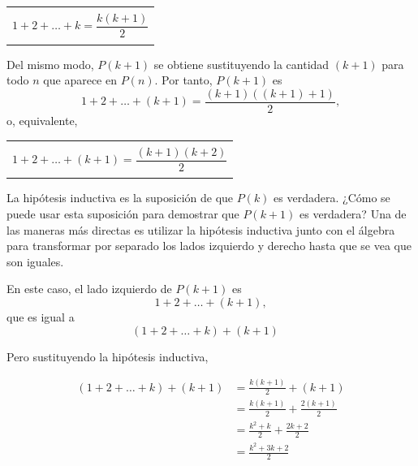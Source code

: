 \documentclass{article}
\begin{document}
\begin{center}
    \begin{tabular}{|c|}
        \hline
        \\
        $1 + 2 + \dots + k = \dfrac{k(k + 1)}{2}$ \\
        \\
        \hline
    \end{tabular} 
\end{center}

\bigskip

Del mismo modo, $P(k + 1)$ se obtiene sustituyendo la cantidad $(k + 1)$ para todo $n$ que aparece en $P(n)$. Por tanto, $P(k + 1)$ es
\[
1 + 2 + \dots + (k + 1) = \frac{(k + 1)((k + 1) + 1)}{2},
\]
o, equivalente,

\begin{center}
    \begin{tabular}{|c|}
        \hline
        \\
        $1 + 2 + \dots + (k + 1) = \dfrac{(k + 1)(k + 2)}{2}$ \\
        \\
        \hline
    \end{tabular} 
\end{center}

 \bigskip

La hipótesis inductiva es la suposición de que $P(k)$ es verdadera. ¿Cómo se puede usar esta suposición para demostrar que $P(k + 1)$ es verdadera? Una de las maneras más directas es utilizar la hipótesis inductiva junto con el álgebra para transformar por separado los lados izquierdo y derecho hasta que se vea que son iguales.

\bigskip

En este caso, el lado izquierdo de $P(k + 1)$ es
\[
1 + 2 + \dots + (k + 1) ,
\]
que es igual a
\[
(1 + 2 + \dots + k) + (k + 1) \quad 
\]

\bigskip

Pero sustituyendo la hipótesis inductiva,

\begin{align*}
    {(1 + 2 + \dots + k)} + (k + 1) &= {\frac{k(k + 1)}{2}} + (k + 1) \\
    &= \frac{k(k + 1)}{2} + \frac{2(k + 1)}{2} \\
    &= \frac{k^2 + k}{2} + \frac{2k + 2}{2} \\
    &= \frac{k^2 + 3k + 2}{2}
\end{align*}
\end{document}
